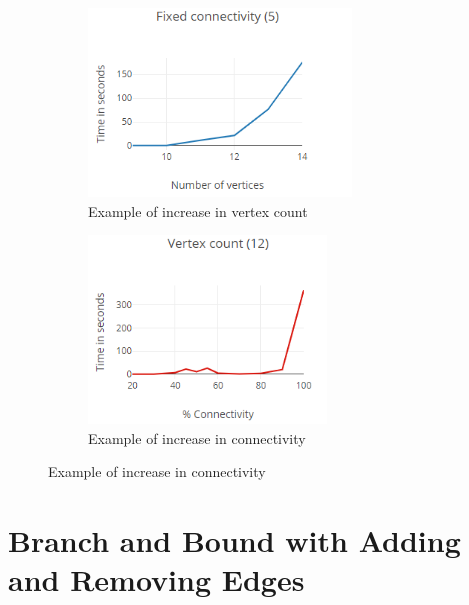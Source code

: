 \documentclass[11pt, english]{article}
\begin{document}
\begin{figure}[H]
\centering
\begin{subfigure}{.33\textwidth}
\includegraphics[height=5cm,valign=t]{fixed_connectivity.png}
\caption{Example of increase in vertex count}
\end{subfigure}%
\hfill
\begin{subfigure}{.33\textwidth}
\includegraphics[height=5cm,valign=t]{fixed_vertices.png}
\caption{Example of increase in connectivity}
\end{subfigure}%
\end{figure}


\section{Branch and Bound with Adding and Removing Edges}
\end{document}
